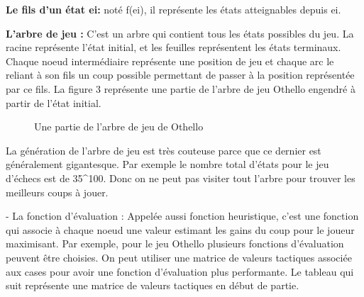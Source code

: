 \documentclass[11pt]{article}
\newcommand{\tmtextbf}[1]{{\bfseries{#1}}}
\begin{document}
\tmtextbf{Le fils d'un état ei:} noté f(ei), il représente les
états atteignables depuis ei.

\tmtextbf{L'arbre de jeu :}\tmtextbf{} C'est un arbre qui contient tous les
états possibles du jeu. La racine représente l'état initial, et
les feuilles représentent les états terminaux. Chaque noeud
intermédiaire représente une position de jeu et chaque arc le reliant
à son fils un coup possible permettant de passer à la position
représentée par ce fils. La figure 3 représente une partie de
l'arbre de jeu Othello engendré à partir de l'état initial.


\begin{figure}[h]
  \caption {Une partie de l'arbre de jeu de Othello}
  \noindent{}
\end{figure}



La génération de l'arbre de jeu est très couteuse parce que ce
dernier est généralement gigantesque. Par exemple le nombre total
d'états pour le jeu d'échecs est de 35\^{}100. Donc on ne peut pas
visiter tout l'arbre pour trouver les meilleurs coups à jouer.

- La fonction d'évaluation : Appelée aussi fonction heuristique, c'est
une fonction qui associe à chaque noeud une valeur estimant les gains du
coup pour le joueur maximisant. Par exemple, pour le jeu Othello plusieurs
fonctions d'évaluation peuvent être choisies. On peut utiliser une
matrice de valeurs tactiques associée aux cases pour avoir une fonction
d'évaluation plus performante. Le tableau qui suit représente une
matrice de valeurs tactiques en début de partie.
\end{document}
